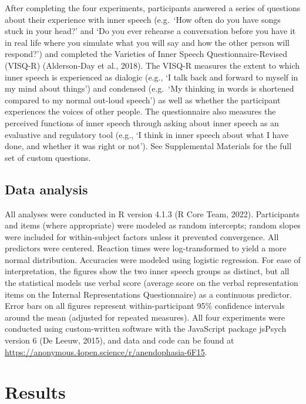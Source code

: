\documentclass[
  man,a4paper,floatsintext]{apa6}
\begin{document}
After completing the four experiments, participants answered a series of questions about their experience with inner speech (e.g.~`How often do you have songs stuck in your head?' and `Do you ever rehearse a conversation before you have it in real life where you simulate what you will say and how the other person will respond?') and completed the Varieties of Inner Speech Questionnaire-Revised (VISQ-R) (Alderson-Day et al., 2018). The VISQ-R measures the extent to which inner speech is experienced as dialogic (e.g., `I talk back and forward to myself in my mind about things') and condensed (e.g.~`My thinking in words is shortened compared to my normal out-loud speech') as well as whether the participant experiences the voices of other people. The questionnaire also measures the perceived functions of inner speech through asking about inner speech as an evaluative and regulatory tool (e.g., `I think in inner speech about what I have done, and whether it was right or not'). See Supplemental Materials for the full set of custom questions.

\hypertarget{data-analysis}{%
\subsection{Data analysis}\label{data-analysis}}

All analyses were conducted in R version 4.1.3 (R Core Team, 2022). Participants and items (where appropriate) were modeled as random intercepts; random slopes were included for within-subject factors unless it prevented convergence. All predictors were centered. Reaction times were log-transformed to yield a more normal distribution. Accuracies were modeled using logistic regression. For ease of interpretation, the figures show the two inner speech groups as distinct, but all the statistical models use verbal score (average score on the verbal representation items on the Internal Representations Questionnaire) as a continuous predictor. Error bars on all figures represent within-participant 95\% confidence intervals around the mean (adjusted for repeated measures). All four experiments were conducted using custom-written software with the JavaScript package jsPsych version 6 (De Leeuw, 2015), and data and code can be found at \url{https://anonymous.4open.science/r/anendophasia-6F15}.

\hypertarget{results}{%
\section{Results}\label{results}}
\end{document}
